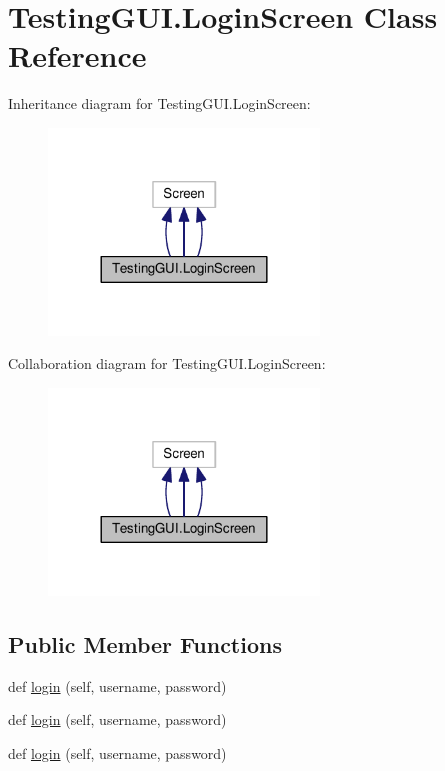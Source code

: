 \hypertarget{classTestingGUI_1_1LoginScreen}{}\section{Testing\+G\+U\+I.\+Login\+Screen Class Reference}
\label{classTestingGUI_1_1LoginScreen}


Inheritance diagram for Testing\+G\+U\+I.\+Login\+Screen\+:
\nopagebreak
\begin{figure}[H]
\begin{center}
\leavevmode
\includegraphics[width=204pt]{classTestingGUI_1_1LoginScreen__inherit__graph}
\end{center}
\end{figure}


Collaboration diagram for Testing\+G\+U\+I.\+Login\+Screen\+:
\nopagebreak
\begin{figure}[H]
\begin{center}
\leavevmode
\includegraphics[width=204pt]{classTestingGUI_1_1LoginScreen__coll__graph}
\end{center}
\end{figure}
\subsection*{Public Member Functions}
\begin{DoxyCompactItemize}
\item 
def \hyperlink{classTestingGUI_1_1LoginScreen_a4a73599bf5eda0f45a27c541a6daf599}{login} (self, username, password)
\item 
def \hyperlink{classTestingGUI_1_1LoginScreen_a4a73599bf5eda0f45a27c541a6daf599}{login} (self, username, password)
\item 
def \hyperlink{classTestingGUI_1_1LoginScreen_a4a73599bf5eda0f45a27c541a6daf599}{login} (self, username, password)
\end{DoxyCompactItemize}


